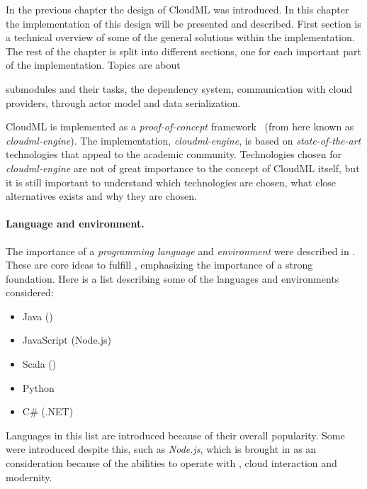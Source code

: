 
In the previous chapter the design of CloudML was introduced.
In this chapter the implementation of this design will be presented and described.
First section is a technical overview of some of the general solutions within 
the implementation.
The rest of the chapter is split into different sections, one for each important part of the implementation.
Topics are about
\begin{ii}
  \iitem submodules and their tasks,
  \iitem the dependency system,
  \iitem communication with cloud providers,
  \iitem {} through actor model and
  \iitem data serialization.
\end{ii}


CloudML is implemented as a \emph{proof-of-concept} framework~\cite{cloudml-engine}
(from here known as \emph{cloudml-engine}). 
The implementation, \emph{cloudml-engine}, 
is based on \emph{state-of-the-art} technologies that appeal to the academic community.
Technologies chosen for \emph{cloudml-engine} are not of great importance to the concept of CloudML itself,
but it is still important to understand which technologies are chosen, what close alternatives exists
and why they are chosen.

\paragraph{Language and environment.} 

The importance of a \emph{programming language} and \emph{environment} were
described in .
These are core ideas to fulfill , emphasizing the importance of a strong foundation.
Here is a list describing some of the languages and environments considered:
\begin{itemize}
  \item Java ()
  \item JavaScript (Node.js)
  \item Scala ()
  \item Python
  \item C\# (.NET)
\end{itemize}
Languages in this list are introduced because of their overall popularity.
Some were introduced despite this, such as \emph{Node.js}, 
which is brought in as an consideration because of the abilities to operate
with , cloud interaction and modernity.

